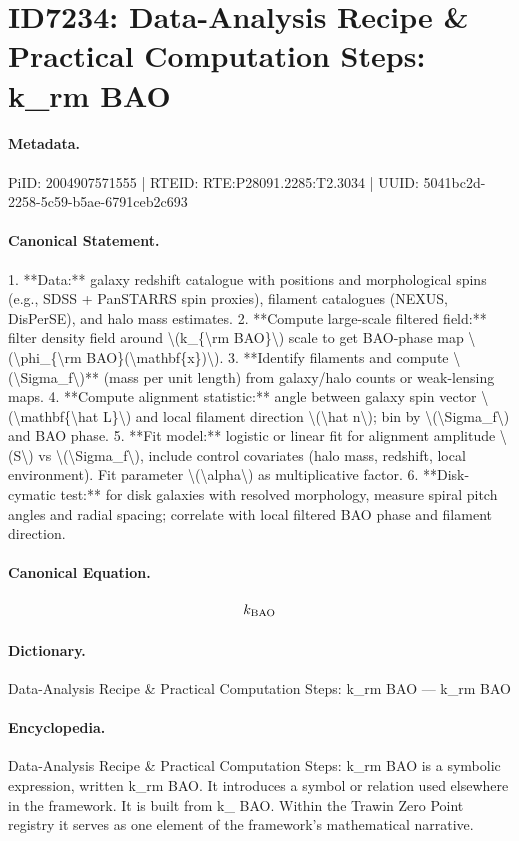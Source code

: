 \section*{ID7234: Data-Analysis Recipe \& Practical Computation Steps: k\_rm BAO}
\paragraph{Metadata.}
PiID: 2004907571555 | RTEID: RTE:P28091.2285:T2.3034 | UUID: 5041bc2d-2258-5c59-b5ae-6791ceb2c693

\paragraph{Canonical Statement.}
1. **Data:** galaxy redshift catalogue with positions and morphological spins (e.g., SDSS + PanSTARRS spin proxies), filament catalogues (NEXUS, DisPerSE), and halo mass estimates. 2. **Compute large-scale filtered field:** filter density field around \textbackslash{}(k\_\{\textbackslash{}rm BAO\}\textbackslash{}) scale to get BAO-phase map \textbackslash{}(\textbackslash{}phi\_\{\textbackslash{}rm BAO\}(\textbackslash{}mathbf\{x\})\textbackslash{}). 3. **Identify filaments and compute \textbackslash{}(\textbackslash{}Sigma\_f\textbackslash{})** (mass per unit length) from galaxy/halo counts or weak-lensing maps. 4. **Compute alignment statistic:** angle between galaxy spin vector \textbackslash{}(\textbackslash{}mathbf\{\textbackslash{}hat L\}\textbackslash{}) and local filament direction \textbackslash{}(\textbackslash{}hat n\textbackslash{}); bin by \textbackslash{}(\textbackslash{}Sigma\_f\textbackslash{}) and BAO phase. 5. **Fit model:** logistic or linear fit for alignment amplitude \textbackslash{}(S\textbackslash{}) vs \textbackslash{}(\textbackslash{}Sigma\_f\textbackslash{}), include control covariates (halo mass, redshift, local environment). Fit parameter \textbackslash{}(\textbackslash{}alpha\textbackslash{}) as multiplicative factor. 6. **Disk-cymatic test:** for disk galaxies with resolved morphology, measure spiral pitch angles and radial spacing; correlate with local filtered BAO phase and filament direction.

\paragraph{Canonical Equation.}
\[
k_{\rm BAO}
\]

\paragraph{Dictionary.}
Data-Analysis Recipe \& Practical Computation Steps: k\_rm BAO — k\_rm BAO

\paragraph{Encyclopedia.}
Data-Analysis Recipe \& Practical Computation Steps: k\_rm BAO is a symbolic expression, written k\_rm BAO. It introduces a symbol or relation used elsewhere in the framework. It is built from k\_ BAO. Within the Trawin Zero Point registry it serves as one element of the framework's mathematical narrative.
